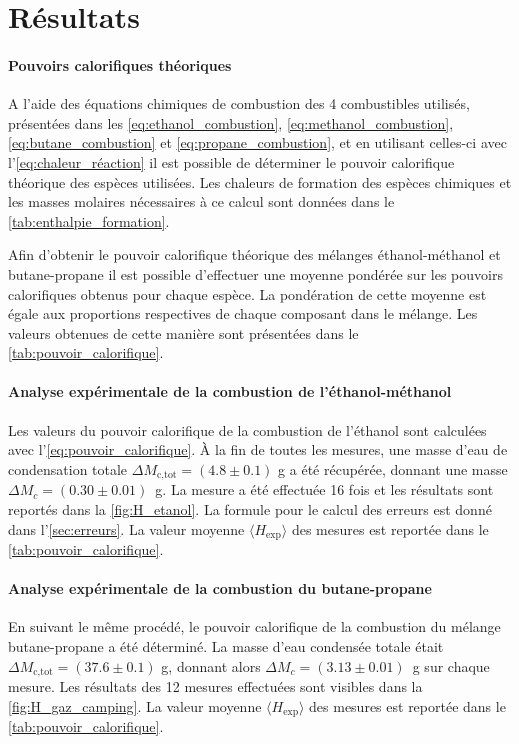 \section{Résultats}

\paragraph*{Pouvoirs calorifiques théoriques}
A l'aide des équations chimiques de combustion des 4 combustibles utilisés, présentées dans les \autoref{eq:ethanol_combustion}, \autoref{eq:methanol_combustion}, \autoref{eq:butane_combustion} et \autoref{eq:propane_combustion}, et en utilisant celles-ci avec l'\autoref{eq:chaleur_réaction} il est possible de déterminer le pouvoir calorifique théorique des espèces utilisées. Les chaleurs de formation des espèces chimiques et les masses molaires nécessaires à ce calcul sont données dans le \autoref{tab:enthalpie_formation}.

Afin d'obtenir le pouvoir calorifique théorique des mélanges éthanol-méthanol et butane-propane il est possible d'effectuer une moyenne pondérée sur les pouvoirs calorifiques obtenus pour chaque espèce. La pondération de cette moyenne est égale aux proportions respectives de chaque composant dans le mélange. Les valeurs obtenues de cette manière sont présentées dans le \autoref{tab:pouvoir_calorifique}.

\paragraph*{Analyse expérimentale de la combustion de l'éthanol-méthanol}
Les valeurs du pouvoir calorifique de la combustion de l'éthanol sont calculées avec l'\autoref{eq:pouvoir_calorifique}. À la fin de toutes les mesures, une masse d'eau de condensation totale \(\Delta M_\textrm{c,tot} = (4.8 \pm 0.1)\) \si{\gram} a été récupérée, donnant une masse \mbox{\(\Delta M_c = (0.30 \pm 0.01)\) \si{\gram}}. La mesure a été effectuée 16 fois et les résultats sont reportés dans la \autoref{fig:H_etanol}. La formule pour le calcul des erreurs est donné dans l'\autoref{sec:erreurs}. La valeur moyenne \(\langle H_\textrm{exp} \rangle\) des mesures est reportée dans le \autoref{tab:pouvoir_calorifique}.

\paragraph*{Analyse expérimentale de la combustion du butane-propane}
En suivant le même procédé, le pouvoir calorifique de la combustion du mélange butane-propane a été déterminé. La masse d'eau condensée totale était \(\Delta M_\textrm{c,tot} = (37.6 \pm 0.1)\) \si{\gram}, donnant alors \mbox{\(\Delta M_c = (3.13 \pm 0.01)\) \si{\gram}} sur chaque mesure. Les résultats des 12 mesures effectuées sont visibles dans la \autoref{fig:H_gaz_camping}. La valeur moyenne \(\langle H_\textrm{exp} \rangle\) des mesures est reportée dans le \autoref{tab:pouvoir_calorifique}.

